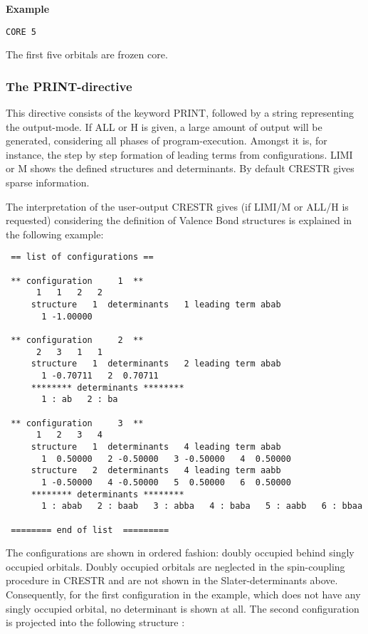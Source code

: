 \documentclass[11pt,fleqn]{article}
\begin{document}
{\bf Example }
\begin{verbatim}
CORE 5
\end{verbatim} 

The first five orbitals are frozen core.

\subsubsection{The PRINT-directive}

This directive consists of the keyword PRINT, followed by a string 
representing the output-mode. If ALL or H is given, a large amount of 
output will be generated, considering all phases of program-execution. 
Amongst it is, for instance, the step by step formation of 
leading terms from configurations. LIMI or M shows the defined 
structures and determinants. By default CRESTR gives sparse information.

The interpretation of the user-output CRESTR gives (if LIMI/M or ALL/H 
is requested) considering the definition of Valence Bond structures 
is explained in the following example:

\begin{verbatim}
 == list of configurations ==

 ** configuration     1  **
      1   1   2   2
     structure   1  determinants   1 leading term abab
       1 -1.00000

 ** configuration     2  **
      2   3   1   1
     structure   1  determinants   2 leading term abab
       1 -0.70711   2  0.70711
     ******** determinants ********
       1 : ab   2 : ba

 ** configuration     3  **
      1   2   3   4
     structure   1  determinants   4 leading term abab
       1  0.50000   2 -0.50000   3 -0.50000   4  0.50000
     structure   2  determinants   4 leading term aabb
       1 -0.50000   4 -0.50000   5  0.50000   6  0.50000
     ******** determinants ********
       1 : abab   2 : baab   3 : abba   4 : baba   5 : aabb   6 : bbaa

 ======== end of list  =========
\end{verbatim}

The configurations are shown in ordered fashion: doubly occupied behind 
singly occupied orbitals. Doubly occupied orbitals are neglected in the 
spin-coupling procedure in CRESTR and are not shown in the Slater-determinants above. 
Consequently, for the first configuration in the example, which does not 
have any singly occupied orbital, no determinant is shown at all. 
The second configuration is projected into the following structure :
\end{document}

